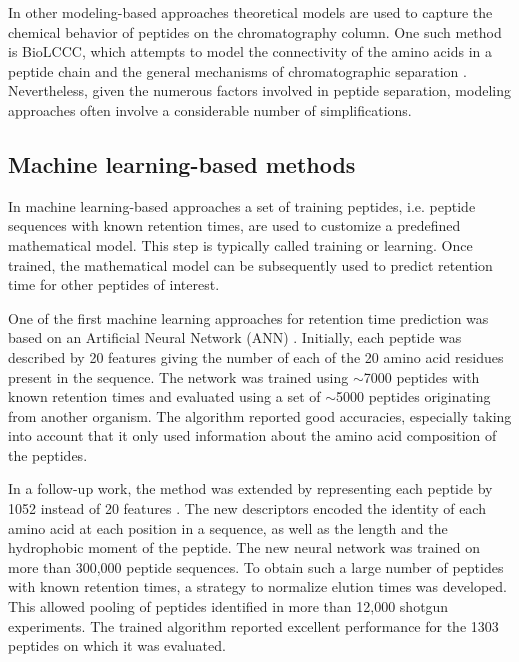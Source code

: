 \documentclass[a4paper]{article}
\begin{document}
In other modeling-based approaches theoretical models are used to
capture the chemical behavior of peptides on the chromatography
column. One such method is BioLCCC, which attempts to model the
connectivity of the amino acids in a peptide chain and the general
mechanisms of chromatographic
separation \cite{gorshkov2006}. Nevertheless, given the numerous
factors involved in peptide separation, modeling approaches often
involve a considerable number of simplifications.

 
\subsection{Machine learning-based methods}

In machine learning-based approaches a set of training peptides,
i.e. peptide sequences with known retention times, are used to
customize a predefined mathematical model. This step is typically
called training or learning. Once trained, the mathematical model can
be subsequently used to predict retention time for other peptides of
interest.



One of the first machine learning approaches for retention time
prediction was based on an Artificial Neural Network
(ANN) \cite{petritis2003}. Initially, each peptide was described by 20
features giving the number of each of the 20 amino acid residues
present in the sequence. The network was trained using $\sim$7000
peptides with known retention times and evaluated using a set of
$\sim$5000 peptides originating from another organism. The algorithm
reported good accuracies, especially taking into account that it only
used information about the amino acid composition of the peptides.



In a follow-up work, the method was extended by representing each
 peptide by 1052 instead of 20
 features \cite{petritis2006improved}. The new descriptors encoded the
 identity of each amino acid at each position in a sequence, as well
 as the length and the hydrophobic moment of the peptide. The new
 neural network was trained on more than 300,000 peptide sequences. To
 obtain such a large number of peptides with known retention times, a
 strategy to normalize elution times was developed. This allowed
 pooling of peptides identified in more than 12,000 shotgun
 experiments. The trained algorithm reported excellent performance for
 the 1303 peptides on which it was evaluated.
\end{document}
